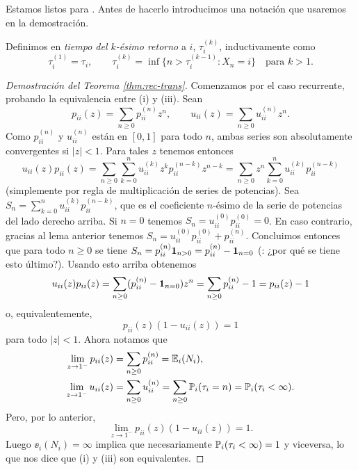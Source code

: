 Estamos listos para .
Antes de hacerlo introducimos una notación que usaremos en la demostración.

\begin{defn}\label{def:k-retorno}
Definimos en \emph{tiempo del $k$-ésimo retorno} a $i$, $\tau^{(k)}_i$, inductivamente como
\[\tau^{(1)}_i=\tau_i,\qquad\tau^{(k)}_i=\inf\{n>\tau^{(k-1)}_i\!:X_n=i\}\quad\text{para $k>1$}.\]
\end{defn}

\begin{proof}[Demostración del Teorema \ref{thm:rec-trans}]
Comenzamos por el caso recurrente, probando la equivalencia entre (i) y (iii).
Sean
\begin{equation}
p_{ii}(z)=\sum_{n\geq0}p^{(n)}_{ii}z^n,\qquad u_{ii}(z)=\sum_{n\geq0}u^{(n)}_{ii}z^n.
\end{equation}
Como $p^{(n)}_{ii}$ y $u^{(n)}_{ii}$ están en $[0,1]$ para todo $n$, ambas series son absolutamente convergentes si $|z|<1$.
Para tales $z$ tenemos entonces
\[u_{ii}(z)p_{ii}(z)=\sum_{n\geq0}\sum_{k=0}^nu_{ii}^{(k)}z^kp_{ii}^{(n-k)}z^{n-k}=\sum_{n\geq0}z^n\sum_{k=0}^nu_{ii}^{(k)}p_{ii}^{(n-k)}\]
(simplemente por regla de multiplicación de series de potencias).
Sea $S_n=\sum_{k=0}^nu_{ii}^{(k)}p_{ii}^{(n-k)}$, que es el coeficiente $n$-ésimo de la serie de potencias del lado derecho arriba.
Si $n=0$ tenemos $S_n=u_{ii}^{(0)}p_{ii}^{(0)}=0$.
En caso contrario, gracias al lema anterior tenemos $S_n=u_{ii}^{(0)}p_{ii}^{(0)}+p_{ii}^{(n)}$.
Concluimos entonces que para todo $n\geq0$ se tiene $S_n=p_{ii}^{(n)}\mathbf{1}_{n>0}=p_{ii}^{(n)}-\mathbf{1}_{n=0}$ (\uexers: ¿por qué se tiene esto último?).
Usando esto arriba obtenemos
\[u_{ii}(z)p_{ii}(z)=\sum_{n\geq0}(p_{ii}^{(n)}-\mathbf{1}_{n=0})z^n=\sum_{n\geq0}p_{ii}^{(n)}-1=p_{ii}(z)-1\]
o, equivalentemente,
\[p_{ii}(z)(1-u_{ii}(z))=1\]
para todo $|z|<1$.
Ahora notamos que
\begin{align}
\lim_{z\to1^-}p_{ii}(z)&=\sum_{n\geq0}p_{ii}^{(n)}=\mathbb{E}_i(N_i),\\
\lim_{z\to1^-}u_{ii}(z)&=\sum_{n\geq0}u_{ii}^{(n)}=\sum_{n\geq0}\mathbb{P}_i(\tau_i=n)=\mathbb{P}_i(\tau_i<\infty).
\end{align}
Pero, por lo anterior,
\[\lim_{z\to1^-}p_{ii}(z)(1-u_{ii}(z))=1.\]
Luego $\ee_i(N_i)=\infty$ implica que necesariamente $\mathbb{P}_i(\tau_i<\infty)=1$ y viceversa, lo que nos dice que (i) y (iii) son equivalentes.


\end{proof}
